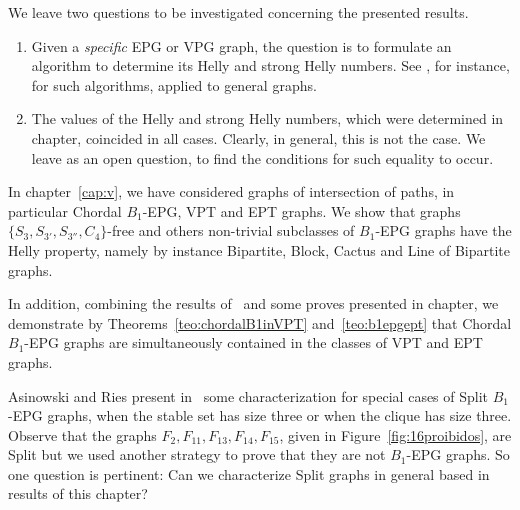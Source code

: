 \normalsize

We leave two questions to be investigated concerning the presented results.

\begin{enumerate}
\item Given a {\it specific}  EPG or VPG graph, the question is to formulate an algorithm to determine its Helly and strong Helly numbers. See \cite{dourado2008improved}, for instance, for such algorithms, applied to general graphs. 

\item The values of the Helly and strong Helly numbers, which were determined in chapter, coincided in all cases. Clearly, in general, this is not the case. We leave as an open question, to find the conditions for such equality to occur. \end{enumerate}


In chapter~\ref{cap:v},  we have considered graphs of intersection of paths, in particular Chordal $B_1$-EPG, VPT and EPT graphs. We show that graphs $\{S_3, S_{3'},S_{3''},C_4\}$-free and others non-trivial subclasses of  $B_1$-EPG graphs have the Helly property, namely by instance Bipartite, Block, Cactus and Line of Bipartite graphs. 
  
  In addition, combining the results of~\cite{alcon2014recognizing,Asinowski2009, golumbic2009} and some proves  presented in chapter, we demonstrate by  Theorems~\ref{teo:chordalB1inVPT} and~\ref{teo:b1epgept} that Chordal $B_1$-EPG graphs are simultaneously contained in the classes of VPT and EPT graphs.  
 
 

Asinowski and Ries present in~\cite{ries2009} some characterization for special cases of Split $B_1$-EPG graphs, when the stable set has size three or when the clique has size three. Observe that the graphs $F_2, F_{11}, F_{13}, F_{14}, F_{15}$, given in Figure~\ref{fig:16proibidos}, are Split but we used another strategy to prove that they are not $B_1$-EPG graphs. So one question is pertinent: Can we characterize Split graphs in general based in results of this chapter? 

